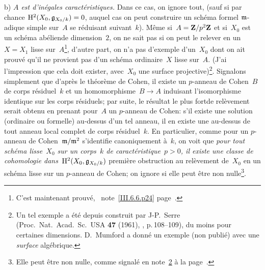 b) \emph{$A$ est d'inégales caractéristiques.} Dans ce cas, on
ignore tout, (sauf si par chance $\mathrm{H}^2(X_0,\mathfrak{g}_{X_0/k})=0$,
auquel cas on peut construire un sch\'ema formel $\mathfrak{m}$-adique
simple sur~$A$ se r\'eduisant suivant~$k$). M\^eme
si~$A=\mathbf{Z}/p^2\mathbf{Z}$ et si~$X_0$ est un sch\'ema \og ab\'elien\fg de
dimension~$2$, on ne sait pas si on peut le relever en un~$X=X_1$ lisse
sur~$A$\footnote{C'est maintenant prouv\'e, \cf \
note~\ref{III.6.6.p24} page~\pageref{III.6.6.p24}.}, d'autre part, on
n'a pas d'exemple d'un~$X_0$ dont on ait prouv\'e qu'il ne provient
pas d'un sch\'ema ordinaire~$X$ lisse sur~$A$. (J'ai l'impression
que cela doit exister, avec~$X_0$ une surface
projective)\footnote{\label{nIII.3}Un tel exemple a \'et\'e depuis
construit par
J-P.\, Serre (Proc.\ Nat.\ Acad.\ Sc.\ USA  \textbf{47} (1961),
, p.\,108--109), du moins pour certaines
dimensions. D.\, Mumford a donn\'e un exemple (non publi\'e) avec
une \emph{surface} alg\'ebrique.}. Signalons simplement que
d'apr\`es le th\'eor\`eme de Cohen, il existe un $p$-anneau de
Cohen~$B$ de corps r\'esiduel~$k$ et un homomorphisme~$B\to A$
induisant l'isomorphisme identique sur les corps r\'esiduels; par
suite, le r\'esultat \og le plus fort\fg de rel\`evement serait
obtenu en prenant pour~$A$
un $p$-anneau de Cohen: s'il existe une solution (ordinaire ou
formelle) au-dessus d'un tel anneau, il en existe une au-dessus de
tout anneau local complet de corps r\'esiduel~$k$. En particulier,
comme pour un $p$-anneau de Cohen~$\mathfrak{m}/\mathfrak{m}^2$ s'identifie
canoniquement \`a~$k$, on voit que \emph{pour tout schéma
lisse~$X_0$ sur un corps~$k$ de caractéristique~$p>0$, il existe
une classe de cohomologie dans~$\mathrm{H}^2(X_0,\mathfrak{g}_{X_0/k})$}
premi\`ere obstruction au rel\`evement de~$X_0$ en un sch\'ema
lisse sur un $p$-anneau de Cohen; on ignore si elle peut \^etre non
nulle\footnote{Elle peut \^etre non nulle, comme signal\'e en
note~\ref{nIII.3} \`a la page~\pageref{nIII.3}.}.

